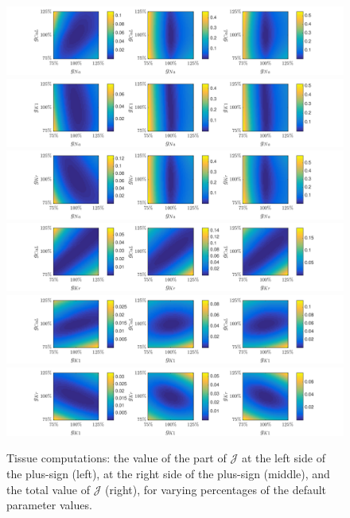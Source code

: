 \documentclass[12pt,a4paper]{article}
\begin{document}
%
\begin{figure}
\includegraphics[trim=0cm 0cm 0cm 0cm, clip=true, width=1\linewidth]{gcalgna} 
\includegraphics[trim=0cm 0cm 0cm 0cm, clip=true, width=1\linewidth]{gk1gna} 
\includegraphics[trim=0cm 0cm 0cm 0cm, clip=true, width=1\linewidth]{gkrgna} 
\includegraphics[trim=0cm 0cm 0cm 0cm, clip=true, width=1\linewidth]{gcalgkr} 
\includegraphics[trim=0cm 0cm 0cm 0cm, clip=true, width=1\linewidth]{gcalgk1} 
\includegraphics[trim=0cm 0cm 0cm 0cm, clip=true, width=1\linewidth]{gkrgk1} 
    \caption{Tissue computations: the value of the part of $\mathcal{J}$ at the left side of the plus-sign (left), at the right side of the plus-sign (middle), and the total value of $\mathcal{J}$ (right), for varying percentages of the default parameter values.}
    \label{fig:11}
\end{figure}
\end{document}
